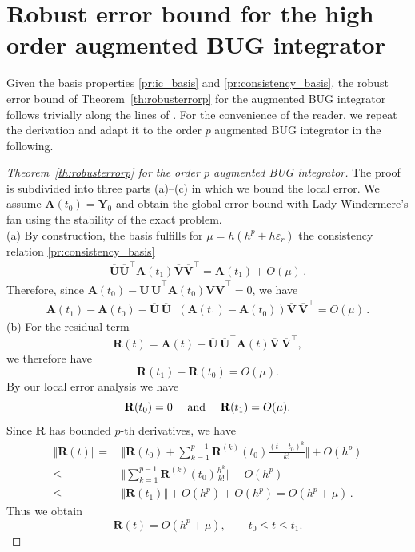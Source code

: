 \documentclass[preprint,runningheads]{svjour3}
\def\eps{\varepsilon}
\def\wt{\widetilde}
\def\wt{\overline}
\newcommand\bfA{{\mathbf A}}
\newcommand\bfR{{\mathbf R}}
\newcommand\bfU{{\mathbf U}}
\newcommand\bfV{{\mathbf V}}
\newcommand\bfY{{\mathbf Y}}
\def\eps{\varepsilon}
\begin{document}
\section{Robust error bound for the high order augmented BUG integrator} \label{sec:error_bound_abug}

Given the basis properties \ref{pr:ic_basis} and \ref{pr:consistency_basis}, the robust error bound of Theorem~\ref{th:robusterrorp} for the augmented BUG integrator follows trivially along the lines of \cite[Theorem~2]{ceruti2024robust}. For the convenience of the reader, we repeat the derivation and adapt it to the order $p$ augmented BUG integrator in the following.
\begin{proof}[Theorem~\ref{th:robusterrorp} for the order $p$ augmented BUG integrator]
The proof is subdivided into three parts (a)--(c) in which we bound the local error. We assume $\bfA(t_0) = \bfY_0$ and obtain the global error bound with Lady Windermere's fan using the stability of the exact problem. \\
(a) By construction, the basis fulfills for $\mu=h(h^p+h\eps_r)$ the consistency relation \ref{pr:consistency_basis}
\begin{align*}
    \wt \bfU\wt \bfU^{\top} \bfA(t_{1}) \wt \bfV\wt \bfV^{\top} = \bfA(t_{1}) + O(\mu)\,.
\end{align*}
Therefore, since $\bfA(t_0)-\wt \bfU \,\wt \bfU^\top \bfA(t_0) \wt \bfV\wt \bfV^{\top} = 0$, we have
\begin{align*}
    \bfA(t_1) - \bfA(t_0) - \wt \bfU \,\wt \bfU^\top (\bfA(t_1)- \bfA(t_0)) \wt \bfV\, \wt \bfV^\top = O(\mu)\,.
\end{align*}
(b) For the residual term
$$
\bfR(t) = \bfA(t) - \wt \bfU \,\wt \bfU^\top \bfA(t) \wt \bfV\, \wt \bfV^\top,
$$
we therefore have
$$
\bfR(t_1)-\bfR(t_0) = O(\mu).
$$
By our local error analysis we have 
$$
\bfR(t_0) = 0  \quad\hbox{ and }\quad \bfR(t_1)=O(\mu).
$$
{Since $\bfR$ has bounded $p$-th derivatives, we have
\begin{align*}
    \Vert \bfR(t)\Vert =\,& \Vert \bfR(t_0) + \sum_{k=1}^{p-1}\bfR^{(k)}(t_0)\frac{(t-t_0)^k}{k!}\Vert + O(h^p)\\
    \leq\,& \Vert \sum_{k=1}^{p-1}\bfR^{(k)}(t_0)\frac{h^k}{k!}\Vert + O(h^p)\\
    \leq\,& \Vert \bfR(t_1)\Vert+ O(h^p) + O(h^p) = O(h^p +\mu)\,.
\end{align*}}
Thus we obtain
$$
\bfR(t) = O(h^p+\mu), \qquad t_0\le t \le t_1.
$$


\end{proof}
\end{document}
